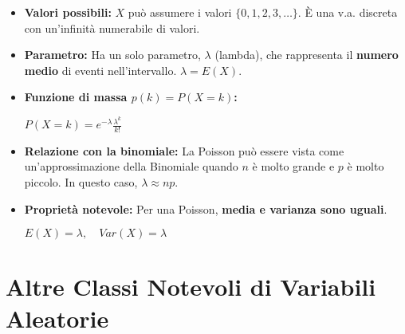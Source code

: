 \documentclass[a4paper, 11pt]{article}
\theoremstyle{definition}
\begin{document}
\begin{itemize}
    \item \textbf{Valori possibili:} $X$ può assumere i valori $\{0, 1, 2, 3, \dots\}$. È una v.a. discreta con un'infinità numerabile di valori.

    \item \textbf{Parametro:} Ha un solo parametro, $\lambda$ (lambda), che rappresenta il \textbf{numero medio} di eventi nell'intervallo. $\lambda = E(X)$.

    \item \textbf{Funzione di massa $p(k) = P(X=k)$:}
    \begin{formulabox}
        $P(X=k) = e^{-\lambda} \frac{\lambda^k}{k!}$
    \end{formulabox}

    \item \textbf{Relazione con la binomiale:} La Poisson può essere vista come un'approssimazione della Binomiale quando $n$ è molto grande e $p$ è molto piccolo. In questo caso, $\lambda \approx np$.

    \item \textbf{Proprietà notevole:} Per una Poisson, \textbf{media e varianza sono uguali}.
    \begin{formulabox}
        $E(X) = \lambda, \quad Var(X) = \lambda$
    \end{formulabox}
\end{itemize}

\section{Altre Classi Notevoli di Variabili Aleatorie}
\end{document}
